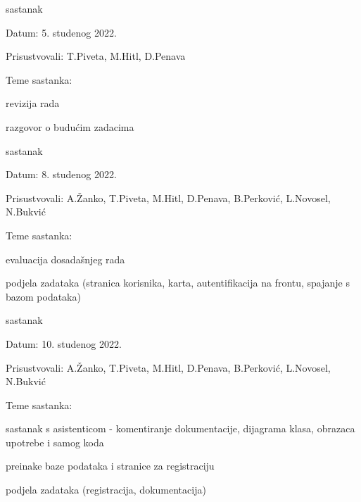 \begin{packed_enum}
			\item  sastanak
			\item[] \begin{packed_item}
				\item Datum: 5. studenog 2022.
				\item Prisustvovali: T.Piveta, M.Hitl, D.Penava
				\item Teme sastanka:
				\begin{packed_item}
				    \item revizija rada
				    \item razgovor o budućim zadacima
				\end{packed_item}
			\end{packed_item}
			
			\item  sastanak
			\item[] \begin{packed_item}
				\item Datum: 8. studenog 2022.
				\item Prisustvovali: A.Žanko, T.Piveta,  M.Hitl, D.Penava, B.Perković, L.Novosel, N.Bukvić
				\item Teme sastanka:
				\begin{packed_item}
				    \item  evaluacija dosadašnjeg rada
				    \item  podjela zadataka (stranica korisnika, karta, autentifikacija na frontu, spajanje s bazom podataka)
				    
				\end{packed_item}
			\end{packed_item}
			
			\item  sastanak
			\item[] \begin{packed_item}
				\item Datum: 10. studenog 2022.
				\item Prisustvovali: A.Žanko, T.Piveta,  M.Hitl, D.Penava, B.Perković, L.Novosel, N.Bukvić
				\item Teme sastanka:
				\begin{packed_item}
				    \item sastanak s asistenticom - komentiranje dokumentacije, dijagrama klasa, obrazaca upotrebe i samog koda
				    \item  preinake baze podataka i stranice za registraciju
				    \item  podjela zadataka (registracija, dokumentacija)
				\end{packed_item}
			\end{packed_item}
			

\end{packed_enum}
